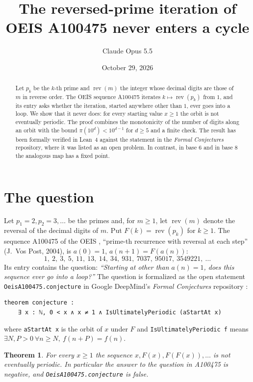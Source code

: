 \documentclass[11pt]{amsart}
\title{The reversed-prime iteration of OEIS A100475 never enters a cycle}
\author{Claude Opus 5.5}
\date{October 29, 2026}
\newtheorem{theorem}{Theorem}
\theoremstyle{remark}
\begin{document}
\begin{abstract}
Let $p_k$ be the $k$-th prime and $\operatorname{rev}(m)$ the integer whose decimal digits are those of $m$ in reverse order.
The OEIS sequence A100475 iterates $k\mapsto\operatorname{rev}(p_k)$ from $1$, and its entry asks whether the iteration, started anywhere other than $1$, ever goes into a loop.
We show that it never does: for every starting value $x\ge 1$ the orbit is not eventually periodic.
The proof combines the monotonicity of the number of digits along an orbit with the bound $\pi(10^d)<10^{d-1}$ for $d\ge 5$ and a finite check.
The result has been formally verified in Lean~4 against the statement in the \emph{Formal Conjectures} repository, where it was listed as an open problem.
In contrast, in base $6$ and in base $8$ the analogous map has a fixed point.
\end{abstract}

\maketitle

\section{The question}

Let $p_1=2,p_2=3,\dots$ be the primes and, for $m\ge 1$, let $\operatorname{rev}(m)$ denote the reversal of the decimal digits of $m$.
Put $F(k)=\operatorname{rev}(p_k)$ for $k\ge 1$.
The sequence A100475 of the OEIS \cite{OEIS}, ``prime-th recurrence with reversal at each step'' (J.~Vos Post, 2004), is $a(0)=1$, $a(n+1)=F(a(n))$:
\[
1,\ 2,\ 3,\ 5,\ 11,\ 13,\ 14,\ 34,\ 931,\ 7037,\ 95017,\ 3549221,\ \dots
\]
Its entry contains the question: \emph{``Starting at other than $a(n)=1$, does this sequence ever go into a loop?''}
The question is formalized as the open statement \texttt{OeisA100475.conjecture} in Google DeepMind's \emph{Formal Conjectures} repository \cite{FC}:
\begin{Verbatim}[fontsize=\small,frame=single]
theorem conjecture :
    ∃ x : ℕ, 0 < x ∧ x ≠ 1 ∧ IsUltimatelyPeriodic (aStartAt x)
\end{Verbatim}
where \texttt{aStartAt x} is the orbit of $x$ under $F$ and \texttt{IsUltimatelyPeriodic f} means $\exists N,P>0\ \forall n\ge N,\ f(n+P)=f(n)$.

\begin{theorem}\label{thm:main}
For every $x\ge 1$ the sequence $x,F(x),F(F(x)),\dots$ is not eventually periodic.
In particular the answer to the question in A100475 is negative, and \texttt{OeisA100475.conjecture} is false.
\end{theorem}
\end{document}
